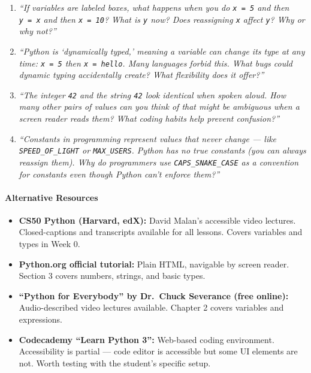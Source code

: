 \documentclass[
  justified,
  openright,
]{tufte-book}
\let\paragraph\paragraph
\let\paragraph\paragraph
\providecommand{\tightlist}{%
  \setlength{\itemsep}{0pt}\setlength{\parskip}{0pt}}
\begin{document}
\begin{enumerate}
\def\labelenumi{\arabic{enumi}.}
\item
  \emph{``If variables are labeled boxes, what happens when you do
  \texttt{x\ =\ 5} and then \texttt{y\ =\ x} and then \texttt{x\ =\ 10}?
  What is \texttt{y} now? Does reassigning \texttt{x} affect \texttt{y}?
  Why or why not?''}
\item
  \emph{``Python is `dynamically typed,' meaning a variable can change
  its type at any time: \texttt{x\ =\ 5} then
  \texttt{x\ =\ \textquotesingle{}hello\textquotesingle{}}. Many
  languages forbid this. What bugs could dynamic typing accidentally
  create? What flexibility does it offer?''}
\item
  \emph{``The integer \texttt{42} and the string
  \texttt{\textquotesingle{}42\textquotesingle{}} look identical when
  spoken aloud. How many other pairs of values can you think of that
  might be ambiguous when a screen reader reads them? What coding habits
  help prevent confusion?''}
\item
  \emph{``Constants in programming represent values that never change
  --- like \texttt{SPEED\_OF\_LIGHT} or \texttt{MAX\_USERS}. Python has
  no true constants (you can always reassign them). Why do programmers
  use \texttt{CAPS\_SNAKE\_CASE} as a convention for constants even
  though Python can't enforce them?''}
\end{enumerate}

\paragraph{Alternative Resources}\label{alternative-resources}

\begin{itemize}
\tightlist
\item
  \textbf{CS50 Python (Harvard, edX):} David Malan's accessible video
  lectures. Closed-captions and transcripts available for all lessons.
  Covers variables and types in Week 0.
\item
  \textbf{Python.org official tutorial:} Plain HTML, navigable by screen
  reader. Section 3 covers numbers, strings, and basic types.
\item
  \textbf{``Python for Everybody'' by Dr.~Chuck Severance (free
  online):} Audio-described video lectures available. Chapter 2 covers
  variables and expressions.
\item
  \textbf{Codecademy ``Learn Python 3'':} Web-based coding environment.
  Accessibility is partial --- code editor is accessible but some UI
  elements are not. Worth testing with the student's specific setup.
\end{itemize}
\end{document}
